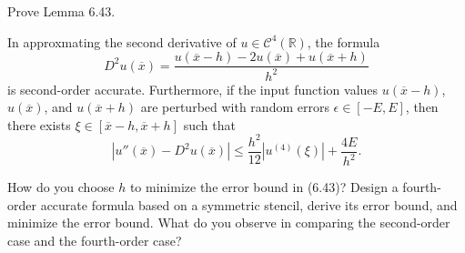 \documentclass[lang=cn,a4paper,newtx,bibend=bibtex]{elegantpaper}
\newcommand{\RBB}{\mathbb{R}}
\newcommand{\CM}{\mathcal{C}}
\begin{document}
\begin{prob}[6.6.1-\textrm{V}]
  Prove Lemma 6.43.
  \begin{prob}
    In approxmating the second derivative of $u\in \CM^4(\RBB)$, the formula
    \[D^2u(\overline{x}) = \dfrac{u(\overline{x} - h) - 2u(\overline{x}) + u(\overline{x} + h)}{h^2}\]
    is second-order accurate. Furthermore, if the input function values $u(\overline{x} - h)$, $u(\overline{x})$,
    and $u(\overline{x} + h)$ are perturbed with random errors $\epsilon \in [-E, E]$, then there exists $\xi \in [\overline{x} - h, \overline{x} + h]$
    such that
    \[ | u''(\overline{x}) - D^2u(\overline{x}) | \le \dfrac{h^2}{12} |u^{(4)}(\xi)|+\dfrac{4E}{h^2}.\]
  \end{prob}
  How do you choose $h$ to minimize the error bound in (6.43)?
  Design a fourth-order accurate formula based on a symmetric stencil, derive its
  error bound, and minimize the error bound. What do you observe in comparing the second-order
  case and the fourth-order case?
\end{prob}
\end{document}
